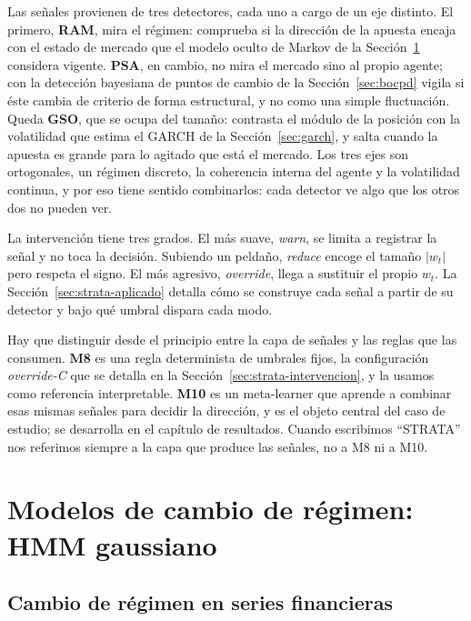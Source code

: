 Las señales provienen de tres detectores, cada uno a cargo de un eje distinto. El primero, \textbf{RAM}, mira el régimen: comprueba si la dirección de la apuesta encaja con el estado de mercado que el modelo oculto de Markov de la Sección~\ref{sec:hmm} considera vigente. \textbf{PSA}, en cambio, no mira el mercado sino al propio agente; con la detección bayesiana de puntos de cambio de la Sección~\ref{sec:bocpd} vigila si éste cambia de criterio de forma estructural, y no como una simple fluctuación. Queda \textbf{GSO}, que se ocupa del tamaño: contrasta el módulo de la posición con la volatilidad que estima el GARCH de la Sección~\ref{sec:garch}, y salta cuando la apuesta es grande para lo agitado que está el mercado. Los tres ejes son ortogonales, un régimen discreto, la coherencia interna del agente y la volatilidad continua, y por eso tiene sentido combinarlos: cada detector ve algo que los otros dos no pueden ver.

La intervención tiene tres grados. El más suave, \emph{warn}, se limita a registrar la señal y no toca la decisión. Subiendo un peldaño, \emph{reduce} encoge el tamaño $|w_t|$ pero respeta el signo. El más agresivo, \emph{override}, llega a sustituir el propio $w_t$. La Sección~\ref{sec:strata-aplicado} detalla cómo se construye cada señal a partir de su detector y bajo qué umbral dispara cada modo.

Hay que distinguir desde el principio entre la capa de señales y las reglas que las consumen. \textbf{M8} es una regla determinista de umbrales fijos, la configuración \emph{override-C} que se detalla en la Sección~\ref{sec:strata-intervencion}, y la usamos como referencia interpretable. \textbf{M10} es un meta-learner que aprende a combinar esas mismas señales para decidir la dirección, y es el objeto central del caso de estudio; se desarrolla en el capítulo de resultados. Cuando escribimos ``STRATA'' nos referimos siempre a la capa que produce las señales, no a M8 ni a M10.

\section{Modelos de cambio de régimen: HMM gaussiano}
\label{sec:hmm}

\subsection{Cambio de régimen en series financieras}
\label{sec:hmm-regimen}

